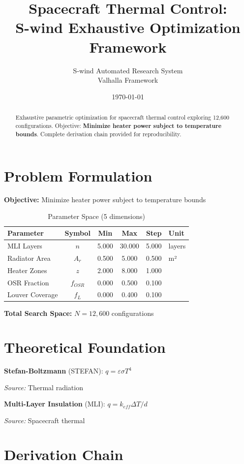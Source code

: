 \documentclass[11pt,twocolumn]{article}
\title{Spacecraft Thermal Control: \\S-wind Exhaustive Optimization Framework}
\author{S-wind Automated Research System\\Valhalla Framework}
\date{\today}
\begin{document}
\maketitle

\begin{abstract}
Exhaustive parametric optimization for spacecraft thermal control exploring 12,600 configurations.
Objective: \textbf{Minimize heater power subject to temperature bounds}.
Complete derivation chain provided for reproducibility.
\end{abstract}

\section{Problem Formulation}
\textbf{Objective:} Minimize heater power subject to temperature bounds

\begin{table}[h]
\centering
\caption{Parameter Space (5 dimensions)}
\begin{tabular}{@{}lccccl@{}}
\toprule
Parameter & Symbol & Min & Max & Step & Unit \\
\midrule
MLI Layers & $n$ & 5.000 & 30.000 & 5.000 & layers \\
Radiator Area & $A_r$ & 0.500 & 5.000 & 0.500 & m² \\
Heater Zones & $z$ & 2.000 & 8.000 & 1.000 &  \\
OSR Fraction & $f_{OSR}$ & 0.000 & 0.500 & 0.100 &  \\
Louver Coverage & $f_L$ & 0.000 & 0.400 & 0.100 &  \\
\bottomrule
\end{tabular}
\end{table}

\textbf{Total Search Space:} $N = 12,600$ configurations

\section{Theoretical Foundation}
\textbf{Stefan-Boltzmann} (STEFAN): $q = \varepsilon\sigma T^4$

\textit{Source:} Thermal radiation

\textbf{Multi-Layer Insulation} (MLI): $q = k_{eff} \Delta T / d$

\textit{Source:} Spacecraft thermal


\section{Derivation Chain}
\end{document}
